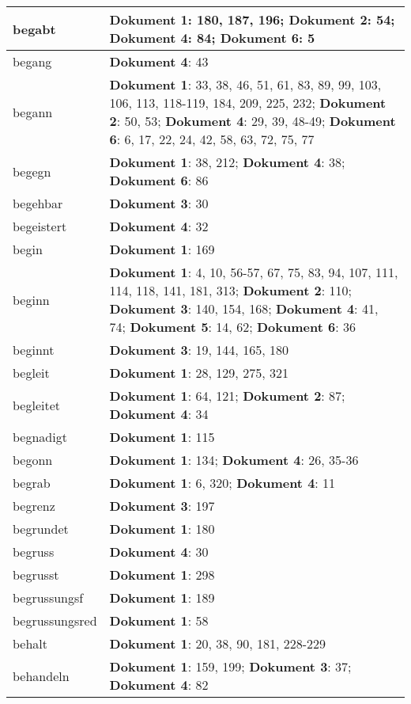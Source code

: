 \documentclass[a5paper]{article}
\begin{document}
\begin{longtable}[l]{|l|p{3in}|}
begabt & \textbf{Dokument 1}: 180, 187, 196; \textbf{Dokument 2}: 54; \textbf{Dokument 4}: 84; \textbf{Dokument 6}: 5 \\
\hline
begang & \textbf{Dokument 4}: 43 \\
\hline
begann & \textbf{Dokument 1}: 33, 38, 46, 51, 61, 83, 89, 99, 103, 106, 113, 118-119, 184, 209, 225, 232; \textbf{Dokument 2}: 50, 53; \textbf{Dokument 4}: 29, 39, 48-49; \textbf{Dokument 6}: 6, 17, 22, 24, 42, 58, 63, 72, 75, 77 \\
\hline
begegn & \textbf{Dokument 1}: 38, 212; \textbf{Dokument 4}: 38; \textbf{Dokument 6}: 86 \\
\hline
begehbar & \textbf{Dokument 3}: 30 \\
\hline
begeistert & \textbf{Dokument 4}: 32 \\
\hline
begin & \textbf{Dokument 1}: 169 \\
\hline
beginn & \textbf{Dokument 1}: 4, 10, 56-57, 67, 75, 83, 94, 107, 111, 114, 118, 141, 181, 313; \textbf{Dokument 2}: 110; \textbf{Dokument 3}: 140, 154, 168; \textbf{Dokument 4}: 41, 74; \textbf{Dokument 5}: 14, 62; \textbf{Dokument 6}: 36 \\
\hline
beginnt & \textbf{Dokument 3}: 19, 144, 165, 180 \\
\hline
begleit & \textbf{Dokument 1}: 28, 129, 275, 321 \\
\hline
begleitet & \textbf{Dokument 1}: 64, 121; \textbf{Dokument 2}: 87; \textbf{Dokument 4}: 34 \\
\hline
begnadigt & \textbf{Dokument 1}: 115 \\
\hline
begonn & \textbf{Dokument 1}: 134; \textbf{Dokument 4}: 26, 35-36 \\
\hline
begrab & \textbf{Dokument 1}: 6, 320; \textbf{Dokument 4}: 11 \\
\hline
begrenz & \textbf{Dokument 3}: 197 \\
\hline
begrundet & \textbf{Dokument 1}: 180 \\
\hline
begruss & \textbf{Dokument 4}: 30 \\
\hline
begrusst & \textbf{Dokument 1}: 298 \\
\hline
begrussungsf & \textbf{Dokument 1}: 189 \\
\hline
begrussungsred & \textbf{Dokument 1}: 58 \\
\hline
behalt & \textbf{Dokument 1}: 20, 38, 90, 181, 228-229 \\
\hline
behandeln & \textbf{Dokument 1}: 159, 199; \textbf{Dokument 3}: 37; \textbf{Dokument 4}: 82 \\

\end{longtable}
\end{document}
